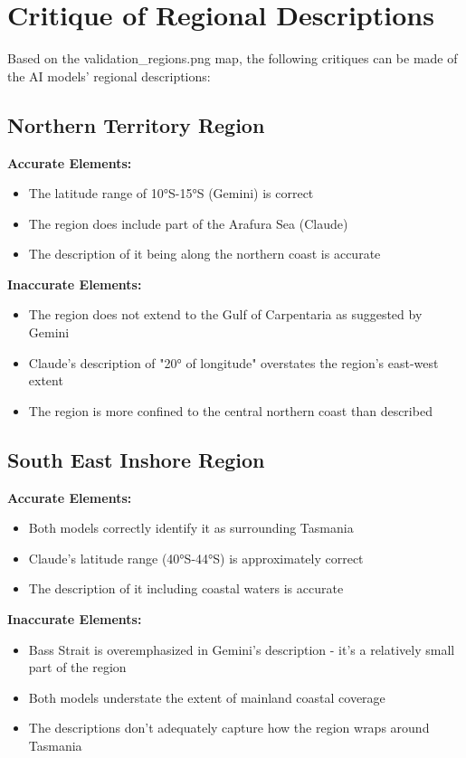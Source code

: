 \section{Critique of Regional Descriptions}

Based on the validation_regions.png map, the following critiques can be made of the AI models' regional descriptions:

\subsection{Northern Territory Region}

\textbf{Accurate Elements:}
\begin{itemize}
    \item The latitude range of 10°S-15°S (Gemini) is correct
    \item The region does include part of the Arafura Sea (Claude)
    \item The description of it being along the northern coast is accurate
\end{itemize}

\textbf{Inaccurate Elements:}
\begin{itemize}
    \item The region does not extend to the Gulf of Carpentaria as suggested by Gemini
    \item Claude's description of "20° of longitude" overstates the region's east-west extent
    \item The region is more confined to the central northern coast than described
\end{itemize}

\subsection{South East Inshore Region}

\textbf{Accurate Elements:}
\begin{itemize}
    \item Both models correctly identify it as surrounding Tasmania
    \item Claude's latitude range (40°S-44°S) is approximately correct
    \item The description of it including coastal waters is accurate
\end{itemize}

\textbf{Inaccurate Elements:}
\begin{itemize}
    \item Bass Strait is overemphasized in Gemini's description - it's a relatively small part of the region
    \item Both models understate the extent of mainland coastal coverage
    \item The descriptions don't adequately capture how the region wraps around Tasmania
\end{itemize}

